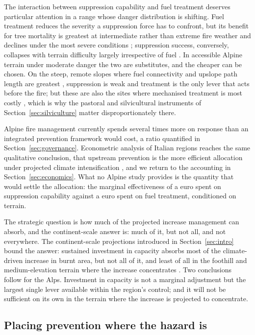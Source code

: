 \documentclass[11pt,a4paper]{article}
\begin{document}
The interaction between suppression capability and fuel treatment deserves particular attention in a range whose danger distribution is shifting. Fuel treatment reduces the severity a suppression force has to confront, but its benefit for tree mortality is greatest at intermediate rather than extreme fire weather and declines under the most severe conditions \citep{brodie_forest_2024}; suppression success, conversely, collapses with terrain difficulty largely irrespective of fuel \citep{cardil_assessing_2025}. In accessible Alpine terrain under moderate danger the two are substitutes, and the cheaper can be chosen. On the steep, remote slopes where fuel connectivity and upslope path length are greatest \citep{conedera_linking_2024}, suppression is weak and treatment is the only lever that acts before the fire; but these are also the sites where mechanised treatment is most costly \citep{dinca_timber_2025}, which is why the pastoral and silvicultural instruments of Section~\ref{sec:silviculture} matter disproportionately there.

Alpine fire management currently spends several times more on response than an integrated prevention framework would cost, a ratio quantified in Section~\ref{sec:governance}. Econometric analysis of Italian regions reaches the same qualitative conclusion, that upstream prevention is the more efficient allocation under projected climate intensification \citep{michetti_forest_2019}, and we return to the accounting in Section~\ref{sec:economics}. What no Alpine study provides is the quantity that would settle the allocation: the marginal effectiveness of a euro spent on suppression capability against a euro spent on fuel treatment, conditioned on terrain.

The strategic question is how much of the projected increase management can absorb, and the continent-scale answer is: much of it, but not all, and not everywhere. The continent-scale projections introduced in Section~\ref{sec:intro} bound the answer: sustained investment in capacity absorbs most of the climate-driven increase in burnt area, but not all of it, and least of all in the foothill and medium-elevation terrain where the increase concentrates \citep{billing_future_2026}. Two conclusions follow for the Alps. Investment in capacity is not a marginal adjustment but the largest single lever available within the region's control; and it will not be sufficient on its own in the terrain where the increase is projected to concentrate.

\subsection{Placing prevention where the hazard is}
\end{document}
